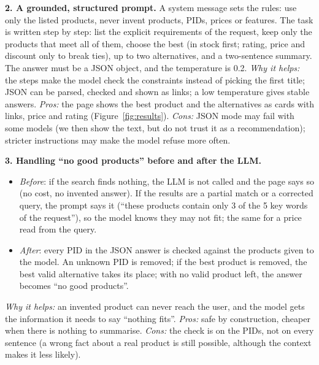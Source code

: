 \documentclass[11pt,a4paper]{article}
\begin{document}
\textbf{2. A grounded, structured prompt.} A system message sets the rules: use only the listed products, never invent
products, PIDs, prices or features. The task is written step by step: list the explicit requirements of the request,
keep only the products that meet all of them, choose the best (in stock first; rating, price and discount only to
break ties), up to two alternatives, and a two-sentence summary. The answer must be a JSON object, and the temperature
is 0.2.
\emph{Why it helps:} the steps make the model check the constraints instead of picking the first title; JSON can be
parsed, checked and shown as links; a low temperature gives stable answers. \emph{Pros:} the page shows the best product
and the alternatives as cards with links, price and rating (Figure~\ref{fig:results}). \emph{Cons:} JSON mode may fail
with some models (we then show the text, but do not trust it as a recommendation); stricter instructions may make the
model refuse more often.

\textbf{3. Handling ``no good products'' before and after the LLM.}
\begin{itemize}
\item \emph{Before}: if the search finds nothing, the LLM is not called and the page says so (no cost, no invented
answer). If the results are a partial match or a corrected query, the prompt says it (``these products contain only 3
of the 5 key words of the request''), so the model knows they may not fit; the same for a price read from the query.
\item \emph{After}: every PID in the JSON answer is checked against the products given to the model. An unknown PID is
removed; if the best product is removed, the best valid alternative takes its place; with no valid product left, the
answer becomes ``no good products''.
\end{itemize}
\emph{Why it helps:} an invented product can never reach the user, and the model gets the information it needs to say
``nothing fits''. \emph{Pros:} safe by construction, cheaper when there is nothing to summarise. \emph{Cons:} the check
is on the PIDs, not on every sentence (a wrong fact about a real product is still possible, although the context makes
it less likely).
\end{document}
